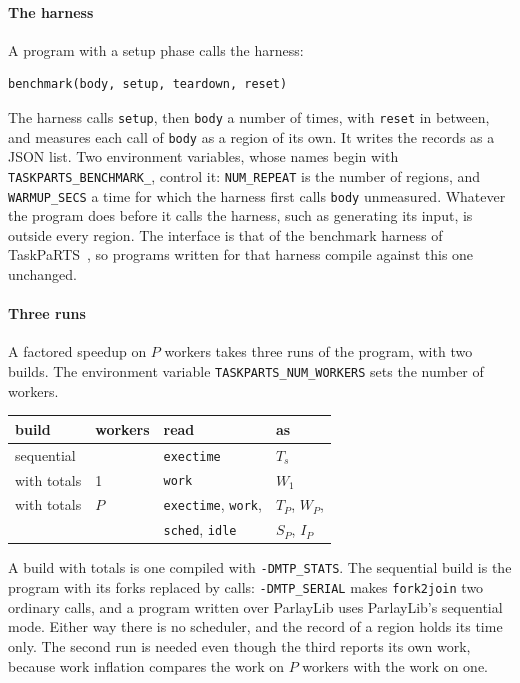 \documentclass[sigplan,nonacm]{acmart}
\begin{document}
\paragraph{The harness}
%
A program with a setup phase calls the harness:
%
\begin{lstlisting}
benchmark(body, setup, teardown, reset)
\end{lstlisting}
%
\begin{sloppypar}
The harness calls \lstinline|setup|, then \lstinline|body| a number
of times, with \lstinline|reset| in between, and measures each call
of \lstinline|body| as a region of its own.
%
It writes the records as a JSON list.
%
Two environment variables, whose names begin with
\lstinline|TASKPARTS_BENCHMARK_|, control it: \lstinline|NUM_REPEAT|
is the number of regions, and \lstinline|WARMUP_SECS| a time for which
the harness first calls \lstinline|body| unmeasured.
%
Whatever the program does before it calls the harness, such as
generating its input, is outside every region.
%
The interface is that of the benchmark harness of
TaskPaRTS~\cite{taskparts}, so programs written for that harness
compile against this one unchanged.
\end{sloppypar}

\paragraph{Three runs}
%
A factored speedup on $P$ workers takes three runs of the program,
with two builds.
%
The environment variable \lstinline|TASKPARTS_NUM_WORKERS| sets the
number of workers.
%
\begin{center}
\small
\begin{tabular}{@{}llll@{}}
\toprule
build & workers & read & as \\
\midrule
sequential & & \lstinline|exectime| & $T_s$ \\
with totals & 1 & \lstinline|work| & $W_1$ \\
with totals & $P$ & \lstinline|exectime|, \lstinline|work|,
  & $T_P$, $W_P$, \\
 & & \lstinline|sched|, \lstinline|idle| & $S_P$, $I_P$ \\
\bottomrule
\end{tabular}
\end{center}
%
A build with totals is one compiled with \lstinline|-DMTP_STATS|.
%
The sequential build is the program with its forks replaced by calls:
\lstinline|-DMTP_SERIAL| makes \lstinline|fork2join| two ordinary
calls, and a program written over ParlayLib uses ParlayLib's
sequential mode.
%
Either way there is no scheduler, and the record of a region holds its
time only.
%
The second run is needed even though the third reports its own work,
because work inflation compares the work on $P$ workers with the work
on one.
\end{document}
